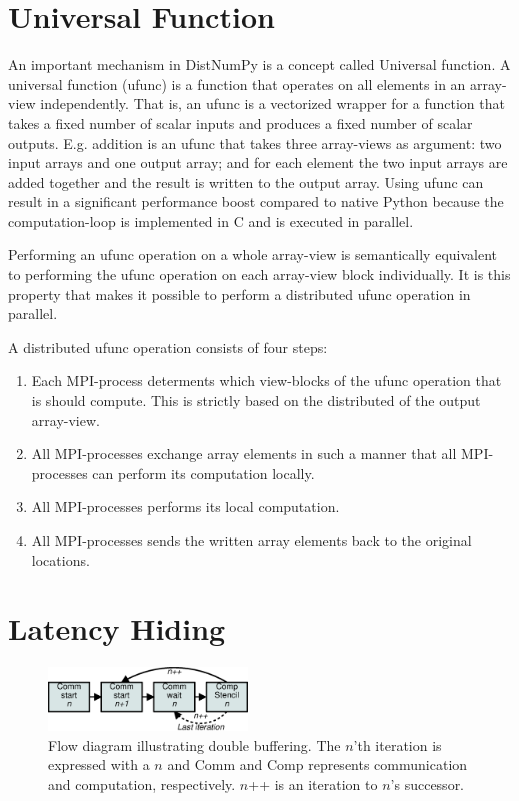 \documentclass[preprint]{../PGAS10/sigplanconf}
\begin{document}
\section{Universal Function}
An important mechanism in DistNumPy is a concept called Universal function. A universal function (ufunc) is a function that operates on all elements in an array-view independently. That is, an ufunc is a vectorized wrapper for a function that takes a fixed number of scalar inputs and produces a fixed number of scalar outputs. E.g. addition is an ufunc that takes three array-views as argument: two input arrays and one output array; and for each element the two input arrays are added together and the result is written to the output array. Using ufunc can result in a significant performance boost compared to native Python because the computation-loop is implemented in C and is executed in parallel.

Performing an ufunc operation on a whole array-view is semantically equivalent to performing the ufunc operation on each array-view block individually. It is this property that makes it possible to perform a distributed ufunc operation in parallel. 

A distributed ufunc operation consists of four steps: 
\begin{enumerate}
\item Each MPI-process determents which view-blocks of the ufunc operation that is should compute. This is strictly based on the distributed of the output array-view. 
\item All MPI-processes exchange array elements in such a manner that all MPI-processes can perform its computation locally. 
\item All MPI-processes performs its local computation.
\item All MPI-processes sends the written array elements back to the original locations.
\end{enumerate}



\section{Latency Hiding}
\begin{figure}
 \centering
 \includegraphics[width=200px]{gfx/double_buffering}
 \caption{Flow diagram illustrating double buffering. The $n$'th iteration is expressed with a $n$ and Comm and Comp represents communication and computation, respectively. $n$++ is an iteration to $n$'s successor.}
 \label{fig:double_buffering}
\end{figure}
\end{document}
